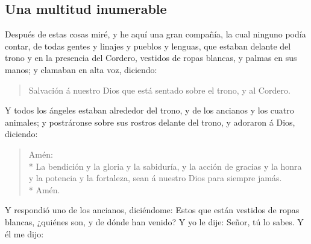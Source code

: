 \subsection*{Una multitud inumerable}
Después de estas cosas miré, y he aquí una gran compañía, la cual ninguno podía contar, de todas gentes y linajes y pueblos y lenguas, que estaban delante del trono y en la presencia del Cordero, vestidos de ropas blancas, y palmas en sus manos; %
y clamaban en alta voz, diciendo:
\begin{verse}
Salvación á nuestro Dios que está sentado sobre el trono, y al Cordero.
\end{verse}
Y todos los ángeles estaban alrededor del trono, y de los ancianos y los cuatro animales; y postráronse sobre sus rostros delante del trono, y adoraron á Dios, %
diciendo:
\begin{verse}
Amén:\\* La bendición y la gloria y la sabiduría, y la acción de gracias y la honra y la potencia y la fortaleza, sean á nuestro Dios para siempre jamás.\\* Amén.
\end{verse}
Y respondió uno de los ancianos, diciéndome: Estos que están vestidos de ropas blancas, ¿quiénes son, y de dónde han venido? %
Y yo le dije: Señor, tú lo sabes.%
 Y él me dijo: 
